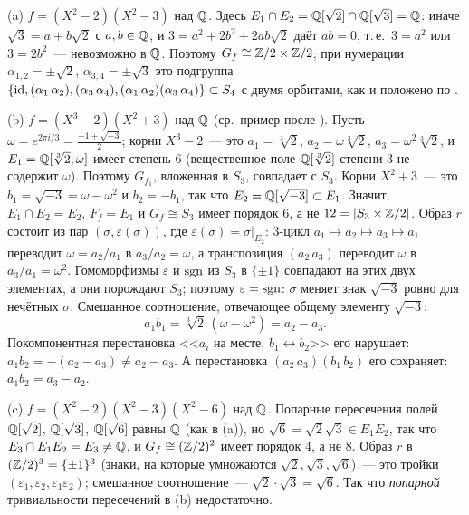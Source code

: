 \begin{example}[3.27g]
(a) $f=(X^2-2)(X^2-3)$ над $\mathbb Q$. Здесь $E_1\cap E_2=\mathbb Q[\sqrt2]\cap\mathbb Q[\sqrt3]=\mathbb Q$: иначе $\sqrt3=a+b\sqrt2$ с $a,b\in\mathbb Q$, и
$3=a^2+2b^2+2ab\sqrt2$ даёт $ab=0$, т.\,е.\ $3=a^2$ или $3=2b^2$~--- невозможно в $\mathbb Q$. Поэтому
$G_f\cong\mathbb Z/2\times\mathbb Z/2$; при нумерации $\alpha_{1,2}=\pm\sqrt2$, $\alpha_{3,4}=\pm\sqrt3$ это подгруппа
$\{\operatorname{id},(\alpha_1\,\alpha_2),(\alpha_3\,\alpha_4),(\alpha_1\,\alpha_2)(\alpha_3\,\alpha_4)\}\subset S_4$ с двумя орбитами, как и
положено по .

(b) $f=(X^3-2)(X^2+3)$ над $\mathbb Q$ (ср.\ пример после ). Пусть $\omega=e^{2\pi i/3}=\frac{-1+\sqrt{-3}}2$; корни $X^3-2$~--- это $a_1=\sqrt[3]2$,
$a_2=\omega\sqrt[3]2$, $a_3=\omega^2\sqrt[3]2$, и $E_1=\mathbb Q[\sqrt[3]2,\omega]$ имеет степень $6$ (вещественное поле $\mathbb Q[\sqrt[3]2]$ степени $3$ не
содержит $\omega$). Поэтому $G_{f_1}$, вложенная в $S_3$, совпадает с $S_3$. Корни $X^2+3$~--- это $b_1=\sqrt{-3}=\omega-\omega^2$ и $b_2=-b_1$, так что
$E_2=\mathbb Q[\sqrt{-3}]\subset E_1$. Значит, $E_1\cap E_2=E_2$, $F_f=E_1$ и $G_f\cong S_3$ имеет порядок $6$, а не $12=|S_3\times\mathbb Z/2|$.
Образ $r$ состоит из пар $(\sigma,\varepsilon(\sigma))$, где $\varepsilon(\sigma)=\sigma|_{E_2}$: $3$-цикл
$a_1\mapsto a_2\mapsto a_3\mapsto a_1$ переводит $\omega=a_2/a_1$ в $a_3/a_2=\omega$, а транспозиция $(a_2\,a_3)$ переводит
$\omega$ в $a_3/a_1=\omega^2$. Гомоморфизмы $\varepsilon$ и $\operatorname{sgn}$ из $S_3$ в $\{\pm1\}$ совпадают на этих двух
элементах, а они порождают $S_3$; поэтому $\varepsilon=\operatorname{sgn}$: $\sigma$ меняет знак $\sqrt{-3}$ ровно для нечётных $\sigma$.
Смешанное соотношение, отвечающее общему элементу $\sqrt{-3}$:
\[
a_1b_1=\sqrt[3]2\,(\omega-\omega^2)=a_2-a_3 .
\]
Покомпонентная перестановка <<$a_i$ на месте, $b_1\leftrightarrow b_2$>> его нарушает: $a_1b_2=-(a_2-a_3)\ne a_2-a_3$. А
перестановка $(a_2\,a_3)(b_1\,b_2)$ его сохраняет: $a_1b_2=a_3-a_2$.

(c) $f=(X^2-2)(X^2-3)(X^2-6)$ над $\mathbb Q$. Попарные пересечения полей $\mathbb Q[\sqrt2]$, $\mathbb Q[\sqrt3]$, $\mathbb Q[\sqrt6]$ равны $\mathbb Q$ (как
в (a)), но $\sqrt6=\sqrt2\sqrt3\in E_1E_2$, так что $E_3\cap E_1E_2=E_3\ne\mathbb Q$, и $G_f\cong(\mathbb Z/2)^2$ имеет порядок $4$, а не
$8$. Образ $r$ в $(\mathbb Z/2)^3=\{\pm1\}^3$ (знаки, на которые умножаются $\sqrt2,\sqrt3,\sqrt6$)~--- это тройки
$(\varepsilon_1,\varepsilon_2,\varepsilon_1\varepsilon_2)$; смешанное соотношение~--- $\sqrt2\cdot\sqrt3=\sqrt6$. Так что
\emph{попарной} тривиальности пересечений в (b) недостаточно.


\end{example}
